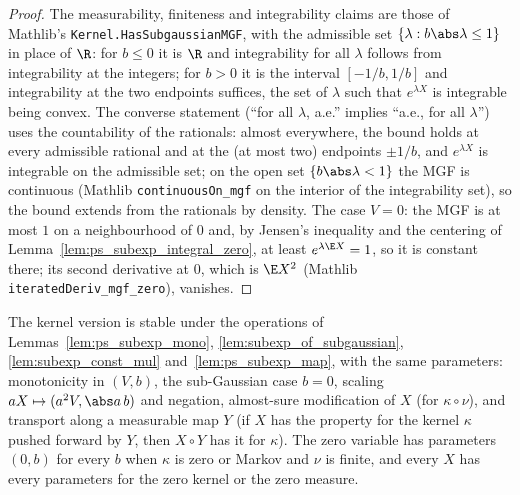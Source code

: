 \begin{proof}
\leanok
{}
The measurability, finiteness and integrability claims are those of Mathlib's
\texttt{Kernel.HasSubgaussianMGF}, with the admissible set $\{\lambda : b\abs\lambda\le1\}$
in place of $\R$: for $b \le 0$ it is $\R$ and integrability for all $\lambda$ follows from
integrability at the integers; for $b > 0$ it is the interval $[-1/b, 1/b]$ and integrability
at the two endpoints suffices, the set of $\lambda$ such that $e^{\lambda X}$ is integrable
being convex. The converse statement (``for all $\lambda$, a.e.'' implies ``a.e., for all
$\lambda$'') uses the countability of the rationals: almost everywhere, the bound holds at
every admissible rational and at the (at most two) endpoints $\pm1/b$, and $e^{\lambda X}$ is
integrable on the admissible set; on the open set $\{b\abs\lambda < 1\}$ the MGF is continuous
(Mathlib \texttt{continuousOn\_mgf} on the interior of the integrability set), so the bound
extends from the rationals by density. The case $V = 0$: the MGF is at most $1$ on a
neighbourhood of $0$ and, by Jensen's inequality and the centering of
Lemma~\ref{lem:ps_subexp_integral_zero}, at least $e^{\lambda\E X} = 1$, so it is constant
there; its second derivative at $0$, which is $\E X^2$ (Mathlib
\texttt{iteratedDeriv\_mgf\_zero}), vanishes.
\end{proof}

\begin{lemma}\label{lem:subexp_kernel_stability}
\leanok
{}
The kernel version is stable under the operations of Lemmas~\ref{lem:ps_subexp_mono},
\ref{lem:subexp_of_subgaussian}, \ref{lem:subexp_const_mul} and~\ref{lem:ps_subexp_map}, with
the same parameters: monotonicity in $(V,b)$, the sub-Gaussian case $b = 0$, scaling
$aX \mapsto (a^2V, \abs a\,b)$ and negation, almost-sure modification of $X$ (for
$\kappa\circ\nu$), and transport along a measurable map $Y$ (if $X$ has the property for the
kernel $\kappa$ pushed forward by $Y$, then $X\circ Y$ has it for $\kappa$). The zero variable
has parameters $(0, b)$ for every $b$ when $\kappa$ is zero or Markov and $\nu$ is finite, and
every $X$ has every parameters for the zero kernel or the zero measure.
\end{lemma}

